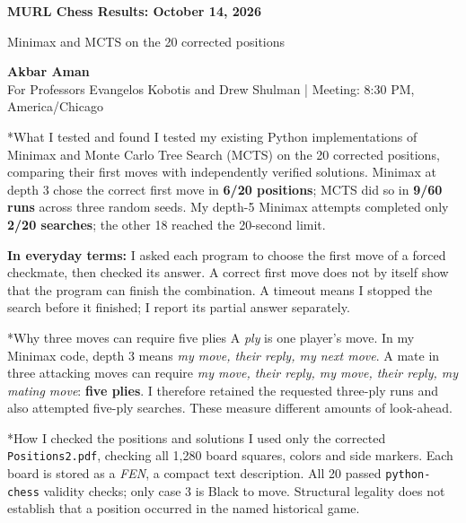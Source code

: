 \documentclass[10pt,letterpaper]{article}
\makeatletter
\renewcommand\section{\@startsection{section}{1}{0pt}{10pt}{5pt}{\normalfont\large\bfseries}}
\makeatother
\begin{document}
{\color{navy}\LARGE\bfseries MURL Chess Results: October 14, 2026\par}
{\large Minimax and MCTS on the 20 corrected positions}\par
\textbf{Akbar Aman}\\
For Professors Evangelos Kobotis and Drew Shulman | Meeting: 8:30 PM, America/Chicago

\section*{What I tested and found}
I tested my existing Python implementations of Minimax and Monte Carlo Tree Search (MCTS) on the 20 corrected positions, comparing their first moves with independently verified solutions. Minimax at depth 3 chose the correct first move in \textbf{6/20 positions}; MCTS did so in \textbf{9/60 runs} across three random seeds. My depth-5 Minimax attempts completed only \textbf{2/20 searches}; the other 18 reached the 20-second limit.

\textbf{In everyday terms:} I asked each program to choose the first move of a forced checkmate, then checked its answer. A correct first move does not by itself show that the program can finish the combination. A timeout means I stopped the search before it finished; I report its partial answer separately.

\section*{Why three moves can require five plies}
A \emph{ply} is one player's move. In my Minimax code, depth 3 means \emph{my move, their reply, my next move}. A mate in three attacking moves can require \emph{my move, their reply, my move, their reply, my mating move}: \textbf{five plies}. I therefore retained the requested three-ply runs and also attempted five-ply searches. These measure different amounts of look-ahead.

\section*{How I checked the positions and solutions}
I used only the corrected \texttt{Positions2.pdf}, checking all 1,280 board squares, colors and side markers. Each board is stored as a \emph{FEN}, a compact text description. All 20 passed \texttt{python-chess} validity checks; only case 3 is Black to move. Structural legality does not establish that a position occurred in the named historical game.
\end{document}

